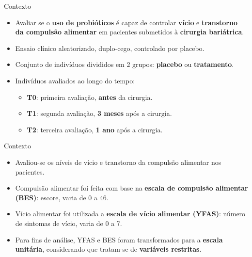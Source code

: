 \documentclass[
  ignorenonframetext,
  serif,
  professionalfont,
  usenames,
  dvipsnames,
  aspectratio = 169]{beamer}
\begin{document}
\begin{frame}{Contexto}
\protect\hypertarget{contexto}{}
\begin{itemize}
  \itemsep 2ex
  
  \item Avaliar se o \textbf{uso de probióticos} é capaz de controlar \textbf{vício} e \textbf{transtorno da compulsão alimentar} em pacientes submetidos à \textbf{cirurgia bariátrica}.

  \item Ensaio clínico aleatorizado, duplo-cego, controlado por placebo.

  \item Conjunto de indivíduos divididos em 2 grupos: \textbf{placebo} ou \textbf{tratamento}.

  \item Indivíduos avaliados ao longo do tempo:
  \begin{itemize}
    \item \textbf{T0}: primeira avaliação, \textbf{antes} da cirurgia.
    \item \textbf{T1}: segunda avaliação, \textbf{3 meses} após a cirurgia.
    \item \textbf{T2}: terceira avaliação, \textbf{1 ano} após a cirurgia.
  \end{itemize}
\end{itemize}
\end{frame}

\begin{frame}{Contexto}
\protect\hypertarget{contexto-1}{}
\begin{itemize}
  \itemsep 2ex
  
  \item Avaliou-se os níveis de vício e transtorno da compulsão alimentar nos pacientes.

  \item Compulsão alimentar foi feita com base na \textbf{escala de compulsão alimentar (BES)}: escore, varia de 0 a 46.

  \item Vício alimentar foi utilizada a \textbf{escala de vício alimentar (YFAS)}: número de sintomas de vício, varia de 0 a 7.

  \item Para fins de análise, YFAS e BES foram transformados para a \textbf{escala unitária}, considerando que tratam-se de \textbf{variáveis restritas}.

\end{itemize}
\end{frame}
\end{document}
